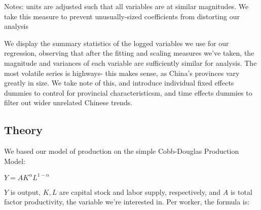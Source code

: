 \documentclass[11pt]{article}
\begin{document}
\begin{table}[H]
\small
\centering

\caption{Summary Statistics }
\label{tab:sumstats_indiv}


\small
Notes: units are adjusted such that all variables are at similar magnitudes. We take this measure to prevent unusually-sized coefficients from distorting our analysis

\end{table} 
We display the summary statistics of the logged variables we use for our regression, observing that after the fitting and scaling measures we've taken, the magnitude and variances of each variable are sufficiently similar for analysis. The most volatile series is highways- this makes sense, as China's provinces vary greatly in size. We take note of this, and introduce individual fixed effects dummies to control for provincial characteristicsm, and time effects dummies to filter out wider unrelated Chinese trends. 

\subsection{Theory}

We based our model of production on the simple Cobb-Douglas Production Model:\\

\begin{center}
$Y=AK^\alpha L^{1-\alpha}$\\
\end{center}

$Y$ is output, $K, L$ are capital stock and labor supply, respectively, and $A$ is total factor productivity, the variable we’re interested in. Per worker, the formula is:\\
\end{document}
